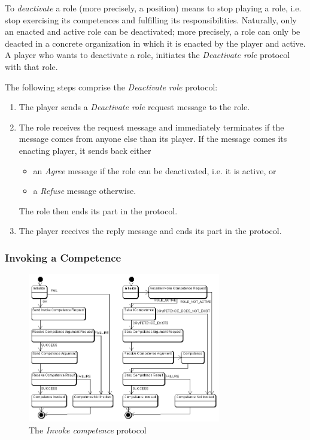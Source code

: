 To \textit{deactivate} a role (more precisely, a position) means to stop playing a role, i.e. stop exercising its competences and fulfilling its responsibilities.
Naturally, only an enacted and active role can be deactivated; more precisely, a role can only be deacted in a concrete organization in which it is enacted by the player and active.
A player who wants to deactivate a role, initiates the \textit{Deactivate role} protocol with that role.

The following steps comprise the \textit{Deactivate role} protocol:
\begin{enumerate}
	\item The player sends a \textit{Deactivate role} request message to the role.
	\item The role receives the request message and immediately terminates if the message comes from anyone else than its player.
	If the message comes its enacting player, it sends back either
	\begin{itemize}
		\item an \textit{Agree} message if the role can be deactivated, i.e. it is active, or
		\item a \textit{Refuse} message otherwise. 
	\end{itemize}
	The role then ends its part in the protocol.
	\item The player receives the reply message and ends its part in the protocol.
\end{enumerate}

\subsubsection{Invoking a Competence}

\begin{figure}[ht]
	\centering
	\includegraphics[width=0.75\textwidth]{images/thespian/invoke-competence-protocol.png}
	\caption{The \textit{Invoke competence} protocol}
	\label{figure:thespian-invoke-competence-protocol}
\end{figure}

